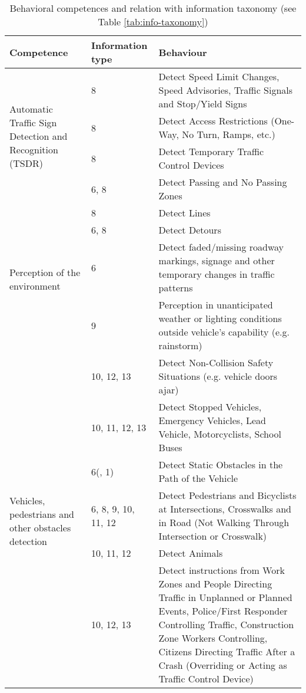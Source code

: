 \begin{table*} %
    \caption{Behavioral competences and relation with information taxonomy 
        (see Table \ref{tab:info-taxonomy})}
    \label{tab:behavioral-competences}
    \begin{tabular*}{\textwidth}{m{4cm} l p{11cm}}%
        \hline %
        \textbf{Competence}	& \textbf{Information type} & \textbf{Behaviour}	
        \\
        \hline %
        \multirow{4}{4cm}{Automatic Traffic Sign Detection
                         and Recognition (TSDR)}
         & 8    & Detect Speed Limit Changes, Speed Advisories, Traffic Signals 
         and Stop/Yield Signs \\
         & 8    & Detect Access Restrictions (One-Way, No Turn, Ramps, etc.) \\
         & 8    & Detect Temporary Traffic Control Devices \\
         & 6, 8 & Detect Passing and No Passing Zones  \\
         \hline %
         \multirow{4}{*}{Perception of the environment}
         & 8 & Detect Lines \\
         & 6, 8 & Detect Detours  \\
         & 6 & Detect faded/missing roadway markings, signage and other 
         temporary changes in traffic patterns \\
         & 9 & Perception in unanticipated weather or lighting conditions 
         outside 
         vehicle’s capability (e.g. rainstorm) \\
         \hline %
         \multirow{6}{4cm}{Vehicles, pedestrians and other obstacles 
         detection}
         & 10, 12, 13 & Detect Non-Collision Safety Situations (e.g. vehicle 
         doors ajar) \\
         & 10, 11, 12, 13 & Detect Stopped Vehicles, Emergency Vehicles, Lead 
         Vehicle, Motorcyclists, School Buses \\
         & 6(, 1)  & Detect Static Obstacles in the Path of the Vehicle \\
         & 6, 8, 9, 10, 11, 12 & Detect Pedestrians and Bicyclists at 
         Intersections, Crosswalks and in Road (Not Walking Through 
         Intersection or Crosswalk) \\
         & 10, 11, 12 & Detect Animals \\
         & 10, 12, 13 & Detect instructions from Work Zones and People 
         Directing Traffic in Unplanned or Planned Events, Police/First 
         Responder Controlling Traffic, Construction Zone Workers Controlling, 
         Citizens Directing Traffic After a Crash (Overriding or Acting as 
         Traffic Control Device) \\

        \hline %
    \end{tabular*}
\end{table*}

